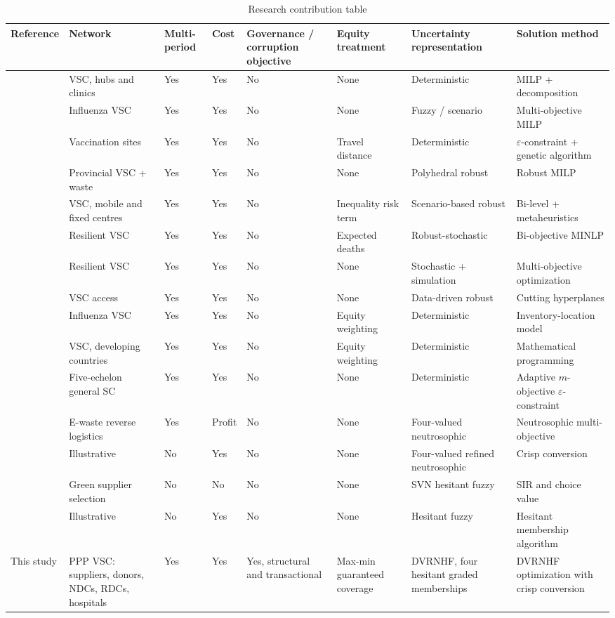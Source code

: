 \documentclass[a4paper]{elsarticle}
\begin{document}
{\begin{table}[!ht]
\centering
\footnotesize
\setlength{\tabcolsep}{3pt}
\renewcommand{\arraystretch}{1.15}
\caption{Research contribution table}
\label{tab:contribution}
\begin{tabular}{@{}p{1.45cm}p{2.1cm}p{1.05cm}p{0.75cm}p{1.75cm}p{1.85cm}p{2.1cm}p{2.4cm}@{}}
\toprule
Reference & Network & Multi-period & Cost & Governance / corruption objective & Equity treatment & Uncertainty representation & Solution method \\
\midrule
\cite{Georgiadis:2021} & VSC, hubs and clinics & Yes & Yes & No & None & Deterministic & MILP + decomposition \\
\cite{Sazvar:2021} & Influenza VSC & Yes & Yes & No & None & Fuzzy / scenario & Multi-objective MILP \\
\cite{Tang:2022} & Vaccination sites & Yes & Yes & No & Travel distance & Deterministic & $\varepsilon$-constraint + genetic algorithm \\
\cite{Isik:2023} & Provincial VSC + waste & Yes & Yes & No & None & Polyhedral robust & Robust MILP \\
\cite{Valizadeh:2023} & VSC, mobile and fixed centres & Yes & Yes & No & Inequality risk term & Scenario-based robust & Bi-level + metaheuristics \\
\cite{Mohammadi:2022} & Resilient VSC & Yes & Yes & No & Expected deaths & Robust-stochastic & Bi-objective MINLP \\
\cite{Khalilpoor:2025} & Resilient VSC & Yes & Yes & No & None & Stochastic + simulation & Multi-objective optimization \\
\cite{Gilani:2022} & VSC access & Yes & Yes & No & None & Data-driven robust & Cutting hyperplanes \\
\cite{Rastegar:2021} & Influenza VSC & Yes & Yes & No & Equity weighting & Deterministic & Inventory-location model \\
\cite{Tavana:2021} & VSC, developing countries & Yes & Yes & No & Equity weighting & Deterministic & Mathematical programming \\
\cite{Sepehri:2024} & Five-echelon general SC & Yes & Yes & No & None & Deterministic & Adaptive $m$-objective $\varepsilon$-constraint \\
\cite{Almuwallad:2026} & E-waste reverse logistics & Yes & Profit & No & None & Four-valued neutrosophic & Neutrosophic multi-objective \\
\cite{Freen:2020} & Illustrative & No & Yes & No & None & Four-valued refined neutrosophic & Crisp conversion \\
\cite{Riaz:2022} & Green supplier selection & No & No & No & None & SVN hesitant fuzzy & SIR and choice value \\
\cite{Bharati:2018} & Illustrative & No & Yes & No & None & Hesitant fuzzy & Hesitant membership algorithm \\
\midrule
This study & PPP VSC: suppliers, donors, NDCs, RDCs, hospitals & Yes & Yes & Yes, structural and transactional & Max-min guaranteed coverage & DVRNHF, four hesitant graded memberships & DVRNHF optimization with crisp conversion \\
\bottomrule
\end{tabular}
\end{table}
}
\end{document}
